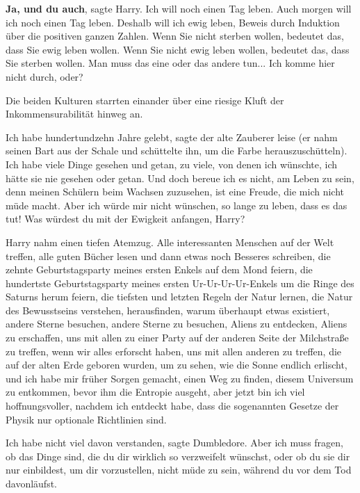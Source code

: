 \glqq \textbf{Ja, und du auch}\grqq{}, sagte Harry. \glqq Ich will noch einen
Tag leben. Auch morgen will ich noch einen Tag leben. Deshalb will ich ewig
leben, Beweis durch Induktion über die positiven ganzen Zahlen. Wenn Sie nicht
sterben wollen, bedeutet das, dass Sie ewig leben wollen. Wenn Sie nicht ewig
leben wollen, bedeutet das, dass Sie sterben wollen. Man muss das eine oder das
andere tun... Ich komme hier nicht durch, oder?\grqq{}

Die beiden Kulturen starrten einander über eine riesige Kluft der
Inkommensurabilität hinweg an.

\glqq Ich habe hundertundzehn Jahre gelebt\grqq{}, sagte der alte Zauberer leise
(er nahm seinen Bart aus der Schale und schüttelte ihn, um die Farbe
herauszuschütteln). \glqq Ich habe viele Dinge gesehen und getan, zu viele, von
denen ich wünschte, ich hätte sie nie gesehen oder getan. Und doch bereue ich es
nicht, am Leben zu sein, denn meinen Schülern beim Wachsen zuzusehen, ist eine
Freude, die mich nicht müde macht. Aber ich würde mir nicht wünschen, so lange
zu leben, dass es das tut! Was würdest du mit der Ewigkeit anfangen,
Harry?\grqq{}

Harry nahm einen tiefen Atemzug. \glqq Alle interessanten Menschen auf der Welt
treffen, alle guten Bücher lesen und dann etwas noch Besseres schreiben, die
zehnte Geburtstagsparty meines ersten Enkels auf dem Mond feiern, die hundertste
Geburtstagsparty meines ersten Ur-Ur-Ur-Ur-Enkels um die Ringe des Saturns herum
feiern, die tiefsten und letzten Regeln der Natur lernen, die Natur des
Bewusstseins verstehen, herausfinden, warum überhaupt etwas existiert, andere
Sterne besuchen, andere Sterne zu besuchen, Aliens zu entdecken, Aliens zu
erschaffen, uns mit allen zu einer Party auf der anderen Seite der Milchstraße
zu treffen, wenn wir alles erforscht haben, uns mit allen anderen zu treffen,
die auf der alten Erde geboren wurden, um zu sehen, wie die Sonne endlich
erlischt, und ich habe mir früher Sorgen gemacht, einen Weg zu finden, diesem
Universum zu entkommen, bevor ihm die Entropie ausgeht, aber jetzt bin ich viel
hoffnungsvoller, nachdem ich entdeckt habe, dass die sogenannten Gesetze der
Physik nur optionale Richtlinien sind.\grqq{}

\glqq Ich habe nicht viel davon verstanden\grqq{}, sagte Dumbledore. \glqq Aber
ich muss fragen, ob das Dinge sind, die du dir wirklich so verzweifelt wünschst,
oder ob du sie dir nur einbildest, um dir vorzustellen, nicht müde zu sein,
während du vor dem Tod davonläufst.\grqq{}

